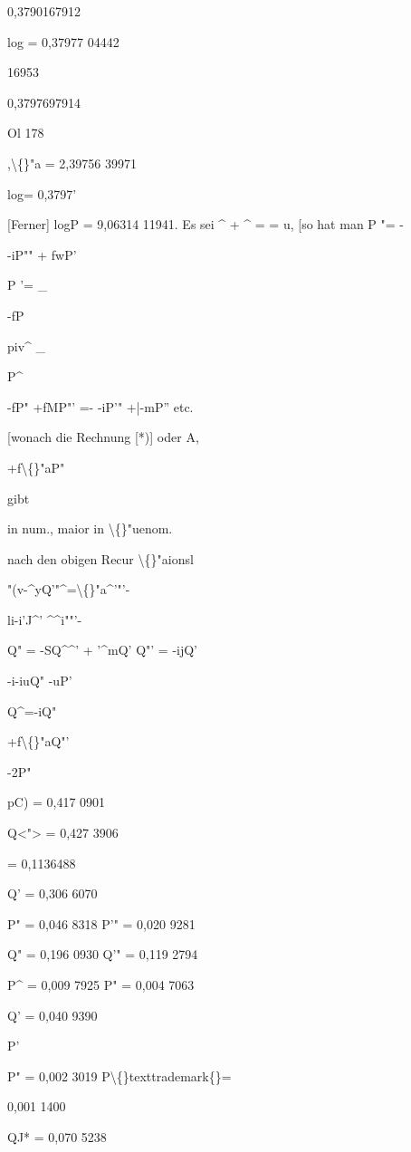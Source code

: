 \documentclass[10pt,a4paper]{article}
\begin{document}
0,3790167912

log = 0,37977 04442

16953

0,3797697914

Ol 178

,\textbackslash\{\}"a = 2,39756 39971

log= 0,3797'

[Ferner]
logP = 9,06314 11941.
Es sei \textasciicircum{} + \textasciicircum{} = = u, [so hat man
P "= -

-iP"" + fwP'

P '= \_

-fP

piv\textasciicircum{} \_

P\textasciicircum{}

-fP"
+fMP"'
=- -iP'" +|-mP''
etc.

[wonach die Rechnung
[*)] oder A,

+f\textbackslash\{\}"aP"

gibt

in num., maior in \textbackslash\{\}"uenom.

nach den obigen Recur \textbackslash\{\}"aionsl

"(v-\textasciicircum{}yQ'"\textasciicircum{}=\textbackslash\{\}"a\textasciicircum{}'"'-

li-i'J\textasciicircum{}' \textasciicircum{}\textasciicircum{}i""'-

Q" = -SQ\textasciicircum{}\textasciicircum{}' + '\textasciicircum{}mQ'
Q"' = -ijQ'

-i-iuQ" -uP'

Q\textasciicircum{}=-iQ"

+f\textbackslash\{\}"aQ"'

-2P"

\newpage
pC) = 0,417 0901

Q<"> = 0,427 3906

= 0,1136488

Q' = 0,306 6070

P" = 0,046 8318
P'" = 0,020 9281

Q" = 0,196 0930
Q'" = 0,119 2794

P\textasciicircum{} = 0,009 7925
P" = 0,004 7063

Q' = 0,040 9390

P'

P" = 0,002 3019
P\textbackslash\{\}texttrademark\{\}=

0,001 1400

QJ* = 0,070 5238
\end{document}
